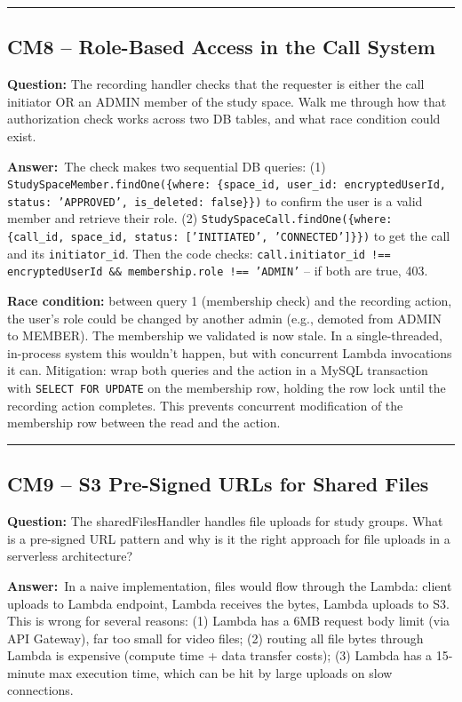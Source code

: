 \documentclass[letterpaper,10pt]{article}
\newlength{\boxwidth}
\newcommand{\questionbox}[1]{%
  \vspace{6pt}%
  \noindent\colorbox{qbg}{%
    \begin{minipage}{\boxwidth}%
      \vspace{3pt}\textbf{\textcolor{nordblue}{Question:}} #1\vspace{3pt}%
    \end{minipage}%
  }\vspace{2pt}%
}
\newcommand{\answerlabel}{\noindent\textbf{\textcolor{answerblue}{Answer:}}~}
\begin{document}
\medskip\rule{\linewidth}{0.2pt}

\subsection*{CM8 -- Role-Based Access in the Call System}

\questionbox{The recording handler checks that the requester is either the call initiator OR an ADMIN member of the study space. Walk me through how that authorization check works across two DB tables, and what race condition could exist.}

\answerlabel The check makes two sequential DB queries: (1) \texttt{StudySpaceMember.findOne(\{where: \{space\_id, user\_id: encryptedUserId, status: 'APPROVED', is\_deleted: false\}\})} to confirm the user is a valid member and retrieve their role. (2) \texttt{StudySpaceCall.findOne(\{where: \{call\_id, space\_id, status: ['INITIATED', 'CONNECTED']\}\})} to get the call and its \texttt{initiator\_id}. Then the code checks: \texttt{call.initiator\_id !== encryptedUserId \&\& membership.role !== 'ADMIN'} -- if both are true, 403.

\textbf{Race condition:} between query 1 (membership check) and the recording action, the user's role could be changed by another admin (e.g., demoted from ADMIN to MEMBER). The membership we validated is now stale. In a single-threaded, in-process system this wouldn't happen, but with concurrent Lambda invocations it can. Mitigation: wrap both queries and the action in a MySQL transaction with \texttt{SELECT FOR UPDATE} on the membership row, holding the row lock until the recording action completes. This prevents concurrent modification of the membership row between the read and the action.

\medskip\rule{\linewidth}{0.2pt}

\subsection*{CM9 -- S3 Pre-Signed URLs for Shared Files}

\questionbox{The sharedFilesHandler handles file uploads for study groups. What is a pre-signed URL pattern and why is it the right approach for file uploads in a serverless architecture?}

\answerlabel In a naive implementation, files would flow through the Lambda: client uploads to Lambda endpoint, Lambda receives the bytes, Lambda uploads to S3. This is wrong for several reasons: (1) Lambda has a 6MB request body limit (via API Gateway), far too small for video files; (2) routing all file bytes through Lambda is expensive (compute time + data transfer costs); (3) Lambda has a 15-minute max execution time, which can be hit by large uploads on slow connections.
\end{document}
